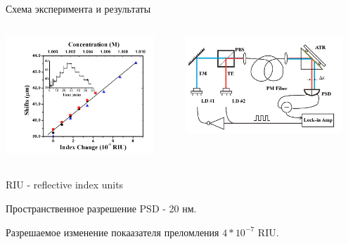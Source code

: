 \documentclass[9pt, compress, xcolor=table]{beamer}
\begin{document}
\begin{frame}{Схема эксперимента и результаты}
\begin{columns}[c]
\column{6.3cm}
\begin{center}
\includegraphics[width=0.9\textwidth]{gh12}
\end{center}
\column{6.3cm}
\begin{center}
\includegraphics[width=0.9\textwidth]{gh13}
\end{center}
\end{columns}

RIU - reflective index units

Пространственное разрешение PSD - 20 нм. 

Разрешаемое изменение покаазателя преломления $4*10^{-7}$ RIU.

\end{frame}
\end{document}
